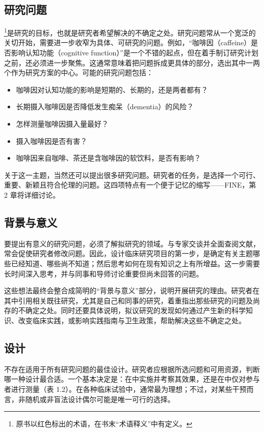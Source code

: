 \subsection{研究问题}
\footnote{原书以红色标出的术语，在书末“术语释义”中有定义。}是研究的目标，也就是研究者希望解决的不确定之处。研究问题常从一个宽泛的关切开始，需要进一步收窄为具体、可研究的问题。例如，“咖啡因（caffeine）是否影响认知功能（cognitive function）”是一个不错的起点，但在着手制订研究计划之前，还必须进一步聚焦。这通常意味着把问题拆成更具体的部分，选出其中一两个作为研究方案的中心。可能的研究问题包括：
\begin{itemize}
\item 咖啡因对认知功能的影响是短期的、长期的，还是两者都有？
\item 长期摄入咖啡因是否降低发生痴呆（dementia）的风险？
\item 怎样测量咖啡因摄入量最好？
\item 摄入咖啡因是否有害？
\item 咖啡因来自咖啡、茶还是含咖啡因的软饮料，是否有影响？
\end{itemize}
关于这一主题，当然还可以提出很多研究问题。研究者的任务，是选择一个可行、重要、新颖且符合伦理的问题。这四项特点有一个便于记忆的缩写——FINE，第 2 章将详细讨论。

\subsection{背景与意义}
要提出有意义的研究问题，必须了解拟研究的领域。与专家交谈并全面查阅文献，常会促使研究者修改问题。因此，设计临床研究项目的第一步，是确定有关主题哪些已经知道、哪些尚不知道；然后思考如何在现有知识之上有所增益。这一步需要长时间深入思考，并与同事和导师讨论重要但尚未回答的问题。

这些想法最终会整合成简明的“背景与意义”部分，说明开展研究的理由。研究者在其中引用相关既往研究，尤其是自己和同事的研究，着重指出那些研究的问题及尚存的不确定之处。同时还要具体说明，拟议研究的发现如何通过产生新的科学知识、改变临床实践，或影响实践指南与卫生政策，帮助解决这些不确定之处。

\subsection{设计}
不存在适用于所有研究问题的最佳设计。研究者应根据所选问题和可用资源，判断哪一种设计最合适。一个基本决定是：在中实施并考察其效果，还是在中仅对参与者进行测量（表 1.2）。在各种临床试验中，通常最为理想；不过，对某些干预而言，非随机或非盲法设计偶尔可能是唯一可行的选择。

